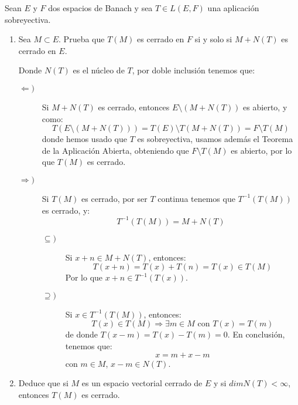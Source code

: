 \begin{ejercicio}
    Sean $E$ y $F$ dos espacios de Banach y sea $T\in L(E,F)$ una aplicación sobreyectiva.
    \begin{enumerate}
        \item Sea $M\subset E$. Prueba que $T(M)$ es cerrado en $F$ si y solo si $M+N(T)$ es cerrado en $E$.

            Donde $N(T)$ es el núcleo de $T$, por doble inclusión tenemos que:
            \begin{description}
                \item [$\Longleftarrow )$] Si $M+N(T)$ es cerrado, entonces $E\setminus(M+N(T))$ es abierto, y como:
                    \begin{equation*}
                        T(E\setminus(M+N(T))) = T(E)\setminus T(M+N(T)) = F\setminus T(M)
                    \end{equation*}
                    donde hemos usado que $T$ es sobreyectiva, usamos además el Teorema de la Aplicación Abierta, obteniendo que $F\setminus T(M)$ es abierto, por lo que $T(M)$ es cerrado.
                \item [$\Longrightarrow )$] Si $T(M)$ es cerrado, por ser $T$ continua tenemos que $T^{-1}(T(M))$ es cerrado, y:
                    \begin{equation*}
                        T^{-1}(T(M)) = M+N(T)
                    \end{equation*}
                    \begin{description}
                        \item [$\subseteq )$] Si $x+n\in M+N(T)$, entonces:
                            \begin{equation*}
                                T(x+n) = T(x)+T(n) = T(x) \in T(M)
                            \end{equation*}
                            Por lo que $x+n\in T^{-1}(T(x))$.
                        \item [$\supseteq )$] Si $x\in T^{-1}(T(M))$, entonces:
                            \begin{equation*}
                                T(x) \in T(M) \Longrightarrow \exists m\in M \text{\ con\ } T(x) = T(m)
                            \end{equation*}
                            de donde $T(x-m) = T(x)-T(m) = 0$. En conclusión, tenemos que:
                            \begin{equation*}
                                x = m + x - m
                            \end{equation*}
                            con $m\in M$, $x-m\in N(T)$.
                    \end{description}
            \end{description}
        \item Deduce que si $M$ es un espacio vectorial cerrado de $E$ y si $dim N(T)<\infty$, entonces $T(M)$ es cerrado.


\end{enumerate}
\end{ejercicio}
